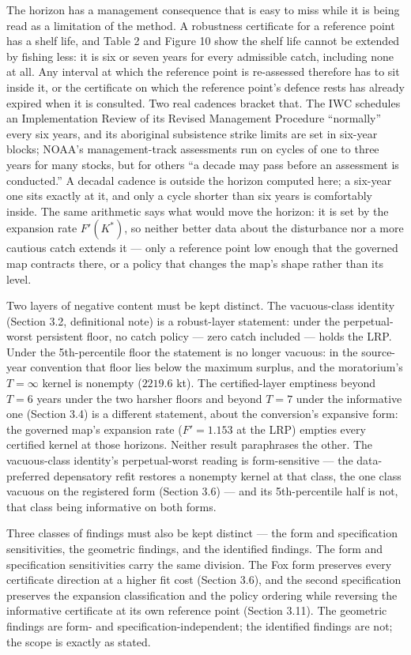 \documentclass[11pt]{article}
\begin{document}
The horizon has a management consequence that is easy to miss while it
is being read as a limitation of the method. A robustness certificate for a
reference point has a shelf life, and Table 2 and Figure 10 show the shelf life cannot be
extended by fishing less: it is six or seven years for every admissible
catch, including none at all. Any interval at which the reference point is
re-assessed therefore has to sit inside it, or the certificate on which the
reference point's defence rests has already expired when it is consulted.
Two real cadences bracket that. The IWC schedules an Implementation Review of
its Revised Management Procedure ``normally'' every six years, and its
aboriginal subsistence strike limits are set in six-year blocks; NOAA's
management-track assessments run on cycles of one to three years for many
stocks, but for others ``a decade may pass before an assessment is
conducted.'' A decadal cadence is outside the horizon computed here; a
six-year one sits exactly at it, and only a cycle shorter than six years is
comfortably inside. The same arithmetic says what would move the horizon:
it is set by the expansion rate \(F'(K^*)\), so neither better data about
the disturbance nor a more cautious catch extends it --- only a reference
point low enough that the governed map contracts there, or a policy that
changes the map's shape rather than its level.

Two layers of negative content must be kept distinct. The vacuous-class
identity (Section 3.2, definitional note) is a robust-layer statement:
under the perpetual-worst persistent floor, no catch policy --- zero
catch included --- holds the LRP. Under the 5th-percentile floor the
statement is no longer vacuous: in the source-year convention that floor
lies below the maximum surplus, and the moratorium's \(T=\infty\) kernel
is nonempty (\(2219.6\) kt). The certified-layer emptiness beyond
\(T = 6\) years under the two harsher floors and beyond \(T = 7\) under
the informative one (Section 3.4) is a different statement, about the
conversion's expansive form: the governed map's expansion rate
(\(F' = 1.153\) at the LRP) empties every certified kernel at those
horizons. Neither result paraphrases the other. The vacuous-class
identity's perpetual-worst reading is form-sensitive --- the
data-preferred depensatory refit restores a nonempty kernel at that
class, the one class vacuous on the registered form (Section 3.6) ---
and its 5th-percentile half is not, that class being informative on both
forms.

Three classes of findings must also be kept distinct --- the form and
specification sensitivities, the geometric findings, and the identified
findings. The form and specification sensitivities carry the same
division. The Fox form preserves every certificate direction at a higher
fit cost (Section 3.6), and the second specification preserves the
expansion classification and the policy ordering while reversing the
informative certificate at its own reference point (Section 3.11). The
geometric findings are form- and specification-independent; the
identified findings are not; the scope is exactly as stated.
\end{document}

